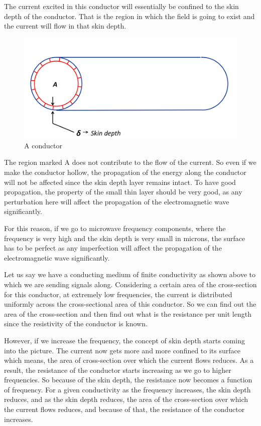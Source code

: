 The current excited in this conductor will essentially be confined to the skin depth of the conductor. That is the region in which the field is going to exist and the current will flow in that skin depth.
\begin{figure}[h]
\centering
\includegraphics[width=1\linewidth]{./graphics/skin_depth}
\caption{A conductor}
\end{figure}

The region marked A does not contribute to the flow of the current. So even if we make the conductor hollow, the propagation of the energy along the conductor will not be affected since the skin depth layer remains intact. To have good propagation, the property of the small thin layer should be very good, as any perturbation here will affect the propagation of the electromagnetic wave significantly.
		
For this reason, if we go to microwave frequency components, where the frequency is very high and the skin depth is very small in microns, the surface has to be perfect as any imperfection will affect the propagation of the electromagnetic wave significantly.

Let us say we have a conducting medium of finite conductivity as shown above to which we are sending signals along. Considering a certain area of the cross-section for this conductor, at extremely low frequencies, the current is distributed uniformly across the cross-sectional area of this conductor. So we can find out the area of the cross-section and then find out what is the resistance per unit length since the resistivity of the conductor is known.

However, if we increase the frequency, the concept of skin depth starts coming into the picture. The current now gets more and more confined to its surface which means, the area of cross-section over which the current flows reduces. As a result, the resistance of the conductor starts increasing as we go to higher frequencies. So because of the skin depth, the resistance now becomes a function of frequency. For a given conductivity as the frequency increases, the skin depth reduces, and as the skin depth reduces, the area of the cross-section over which the current flows reduces, and because of that, the resistance of the conductor increases.

